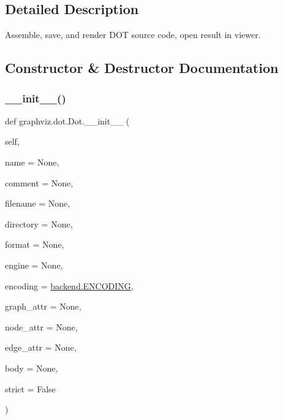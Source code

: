 \subsection{Detailed Description}
\begin{DoxyVerb}Assemble, save, and render DOT source code, open result in viewer.\end{DoxyVerb}
 

\subsection{Constructor \& Destructor Documentation}
\mbox{\label{classgraphviz_1_1dot_1_1Dot_a93f3a7ad03f904b9bf1e52b5a2c92942}} 
\subsubsection{\texorpdfstring{\+\_\+\+\_\+init\+\_\+\+\_\+()}{\_\_init\_\_()}}
{\footnotesize\ttfamily def graphviz.\+dot.\+Dot.\+\_\+\+\_\+init\+\_\+\+\_\+ (\begin{DoxyParamCaption}\item[{}]{self,  }\item[{}]{name = {\ttfamily None},  }\item[{}]{comment = {\ttfamily None},  }\item[{}]{filename = {\ttfamily None},  }\item[{}]{directory = {\ttfamily None},  }\item[{}]{format = {\ttfamily None},  }\item[{}]{engine = {\ttfamily None},  }\item[{}]{encoding = {\ttfamily \hyperlink{namespacegraphviz_1_1backend_aaa5c3555a484c96a0b0e5356ce3a577d}{backend.\+E\+N\+C\+O\+D\+I\+NG}},  }\item[{}]{graph\+\_\+attr = {\ttfamily None},  }\item[{}]{node\+\_\+attr = {\ttfamily None},  }\item[{}]{edge\+\_\+attr = {\ttfamily None},  }\item[{}]{body = {\ttfamily None},  }\item[{}]{strict = {\ttfamily False} }\end{DoxyParamCaption})}



